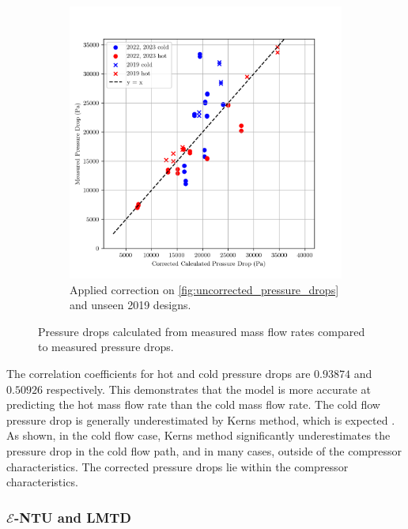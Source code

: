 \documentclass{article}
\begin{document}
\begin{figure}[H]
\begin{subfigure}{.49\textwidth}
    \includegraphics[width=.95\linewidth]{dp_ccalc_vs_meas.png}
    \caption{Applied correction on \ref{fig:uncorrected_pressure_drops} and unseen 2019 designs.}
    \label{fig:corrected_pressure_drops}
  \end{subfigure}
  \caption{Pressure drops calculated from measured mass flow rates compared to measured pressure drops.}
  \label{fig:pressure_drops}
\end{figure}

\vspace{-0.5cm}

The correlation coefficients for hot and cold pressure drops are $\mathbf{0.93874}$ and $\mathbf{0.50926}$ respectively.
This demonstrates that the model is more accurate at predicting the hot mass flow rate than the cold mass flow rate.
The cold flow pressure drop is generally underestimated by Kerns method, which is expected \cite{HE_design}.
As shown, in the cold flow case, Kerns method significantly underestimates the pressure drop in the cold flow path, and in many cases, outside of the compressor characteristics.
The corrected pressure drops lie within the compressor characteristics.

\subsubsection{$\mathcal{E}$-NTU and LMTD}
\end{document}
